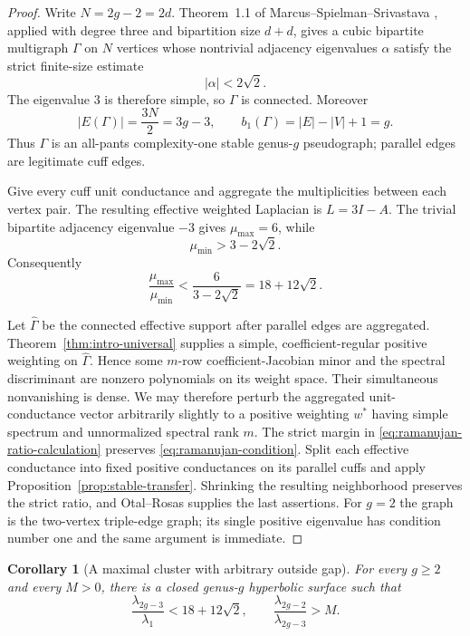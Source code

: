 \documentclass[11pt,reqno]{amsart}
\newtheorem{corollary}[theorem]{Corollary}
\theoremstyle{definition}
\theoremstyle{remark}
\begin{document}
\begin{proof}
Write $N=2g-2=2d$.  Theorem~1.1 of
Marcus--Spielman--Srivastava \cite{MSS2018}, applied with degree three and
bipartition size $d+d$, gives a cubic bipartite multigraph $\Gamma$ on $N$
vertices whose nontrivial adjacency eigenvalues $\alpha$ satisfy the strict
finite-size estimate
\[
 |\alpha|<2\sqrt2.
\]
The eigenvalue $3$ is therefore simple, so $\Gamma$ is connected.  Moreover
\[
 |E(\Gamma)|=\frac{3N}{2}=3g-3,\qquad
 b_1(\Gamma)=|E|-|V|+1=g.
\]
Thus $\Gamma$ is an all-pants complexity-one stable genus-$g$ pseudograph;
parallel
edges are legitimate cuff edges.

Give every cuff unit conductance and aggregate the multiplicities between
each vertex pair.  The resulting effective weighted Laplacian is
$L=3I-A$.  The trivial bipartite adjacency eigenvalue $-3$ gives
$\mu_{\max}=6$, while
\[
 \mu_{\min}>3-2\sqrt2.
\]
Consequently
\begin{equation}\label{eq:ramanujan-ratio-calculation}
 \frac{\mu_{\max}}{\mu_{\min}}
 <\frac6{3-2\sqrt2}=18+12\sqrt2.
\end{equation}

Let $\widehat\Gamma$ be the connected effective support after parallel
edges are aggregated.  Theorem~\ref{thm:intro-universal} supplies a simple,
coefficient-regular positive weighting on $\widehat\Gamma$.  Hence some
$m$-row coefficient-Jacobian minor and the spectral discriminant are
nonzero polynomials on its weight space.  Their simultaneous nonvanishing
is dense.  We may therefore perturb the aggregated unit-conductance vector
arbitrarily slightly to a positive weighting $w^*$ having simple spectrum
and unnormalized spectral rank $m$.  The strict margin in
\eqref{eq:ramanujan-ratio-calculation} preserves
\eqref{eq:ramanujan-condition}.  Split each effective conductance into
fixed positive conductances on its parallel cuffs and apply
Proposition~\ref{prop:stable-transfer}.  Shrinking the resulting
neighborhood preserves the strict ratio, and Otal--Rosas supplies the last
assertions.  For $g=2$ the graph is the two-vertex triple-edge graph; its
single positive eigenvalue has condition number one and the same argument is
immediate.
\end{proof}

\begin{corollary}[A maximal cluster with arbitrary outside gap]
\label{cor:maximal-outside-gap}
For every $g\ge2$ and every $M>0$, there is a closed genus-$g$ hyperbolic
surface such that
\[
 \frac{\lambda_{2g-3}}{\lambda_1}<18+12\sqrt2,
 \qquad
 \frac{\lambda_{2g-2}}{\lambda_{2g-3}}>M.
\]
\end{corollary}
\end{document}
